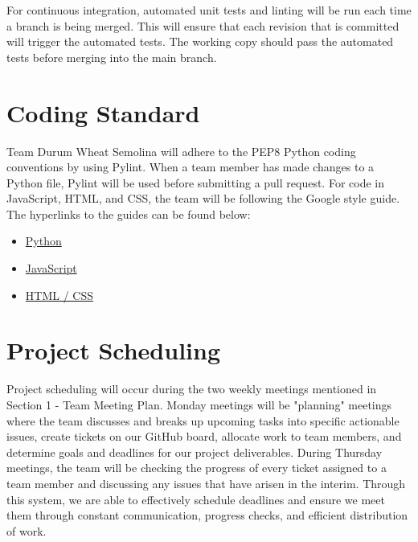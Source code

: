 \documentclass{article}
\begin{document}
For continuous integration, automated unit tests and linting will be run each time a branch is being merged. This will ensure that each revision that is committed will trigger the automated tests. The working copy should pass the automated tests before merging into the main branch. 

\section{Coding Standard}
Team Durum Wheat Semolina will adhere to the PEP8 Python coding conventions by using Pylint. When a team member has made changes to a Python file, Pylint will be used before submitting a pull request. For code in JavaScript, HTML, and CSS, the team will be following the Google style guide. The hyperlinks to the guides can be found below:
\begin{itemize}
	\item \href{https://peps.python.org/pep-0008/}{Python}
	\item \href{https://google.github.io/styleguide/jsguide.html}{JavaScript}
	\item \href{https://google.github.io/styleguide/htmlcssguide.html}{HTML / CSS}
\end{itemize}

\section{Project Scheduling}

Project scheduling will occur during the two weekly meetings mentioned in Section 1 - Team Meeting Plan. Monday meetings will be "planning" meetings where the team discusses and breaks up upcoming tasks into specific actionable issues, create tickets on our GitHub board, allocate work to team members, and determine goals and deadlines for our project deliverables. During Thursday meetings, the team will be checking the progress of every ticket assigned to a team member and discussing any issues that have arisen in the interim. Through this system, we are able to effectively schedule deadlines and ensure we meet them through constant communication, progress checks, and efficient distribution of work.
\end{document}
